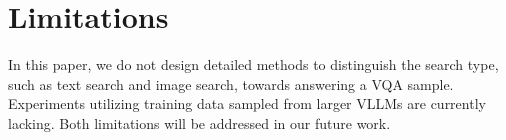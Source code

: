 \section{Limitations}

In this paper, we do not design detailed methods to distinguish the search type, such as text search and image search, towards answering a VQA sample. Experiments utilizing training data sampled from larger VLLMs are currently lacking. Both limitations will be addressed in our future work.


